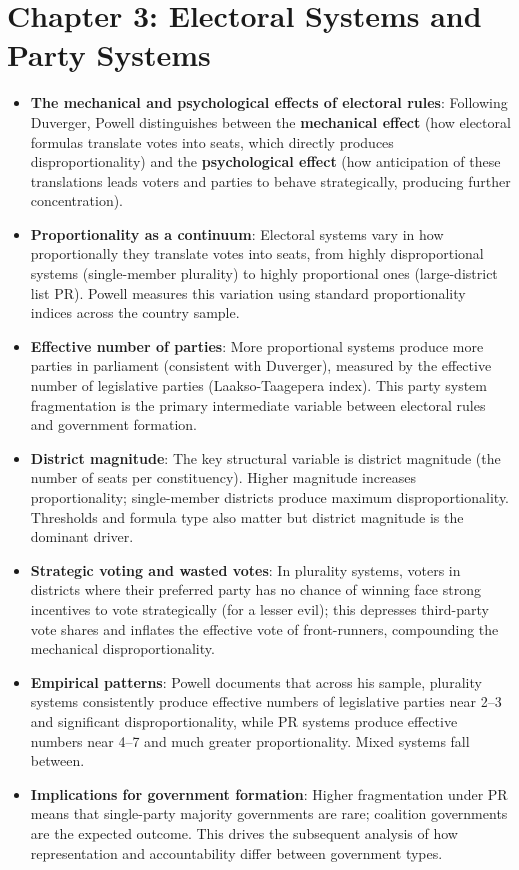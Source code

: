 \documentclass[12pt]{article}
\begin{document}
\section{Chapter 3: Electoral Systems and Party Systems}

\begin{itemize}[leftmargin=*, itemsep=4pt]
    \item \textbf{The mechanical and psychological effects of electoral rules}: Following Duverger, Powell distinguishes between the \textbf{mechanical effect} (how electoral formulas translate votes into seats, which directly produces disproportionality) and the \textbf{psychological effect} (how anticipation of these translations leads voters and parties to behave strategically, producing further concentration).
    \item \textbf{Proportionality as a continuum}: Electoral systems vary in how proportionally they translate votes into seats, from highly disproportional systems (single-member plurality) to highly proportional ones (large-district list PR). Powell measures this variation using standard proportionality indices across the country sample.
    \item \textbf{Effective number of parties}: More proportional systems produce more parties in parliament (consistent with Duverger), measured by the effective number of legislative parties (Laakso-Taagepera index). This party system fragmentation is the primary intermediate variable between electoral rules and government formation.
    \item \textbf{District magnitude}: The key structural variable is district magnitude (the number of seats per constituency). Higher magnitude increases proportionality; single-member districts produce maximum disproportionality. Thresholds and formula type also matter but district magnitude is the dominant driver.
    \item \textbf{Strategic voting and wasted votes}: In plurality systems, voters in districts where their preferred party has no chance of winning face strong incentives to vote strategically (for a lesser evil); this depresses third-party vote shares and inflates the effective vote of front-runners, compounding the mechanical disproportionality.
    \item \textbf{Empirical patterns}: Powell documents that across his sample, plurality systems consistently produce effective numbers of legislative parties near 2--3 and significant disproportionality, while PR systems produce effective numbers near 4--7 and much greater proportionality. Mixed systems fall between.
    \item \textbf{Implications for government formation}: Higher fragmentation under PR means that single-party majority governments are rare; coalition governments are the expected outcome. This drives the subsequent analysis of how representation and accountability differ between government types.
\end{itemize}
\end{document}

